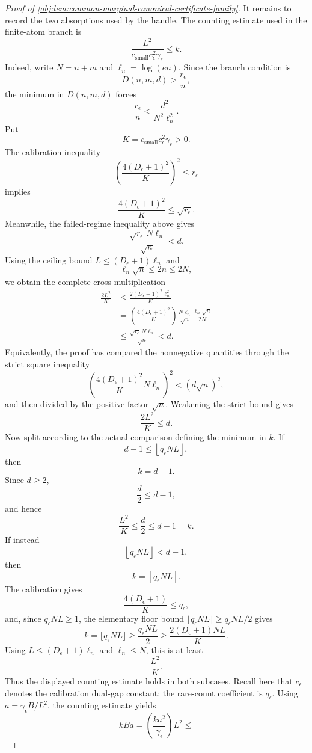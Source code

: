 \documentclass[11pt]{article}
\begin{document}
\begin{proof}[Proof of \cref{obj:lem:common-marginal-canonical-certificate-family}]
It remains to record the two absorptions used by the handle.  The counting estimate used in the finite-atom branch is
\[
\frac{L^2}{c_{\mathrm{small}}c_\epsilon^2\gamma_\epsilon}\le k .
\]
Indeed, write \(N=n+m\) and \(\ell_n=\log(en)\).  Since the branch condition is
\[
D(n,m,d)>\frac{r_\epsilon}{n},
\]
the minimum in \(D(n,m,d)\) forces
\[
\frac{r_\epsilon}{n}
<
\frac{d^2}{N^2\ell_n^2}.
\]
Put
\[
K=c_{\mathrm{small}}c_\epsilon^2\gamma_\epsilon>0.
\]
The calibration inequality
\[
\left(
\frac{4(D_\epsilon+1)^2}{K}
\right)^2
\le r_\epsilon
\]
implies
\[
\frac{4(D_\epsilon+1)^2}{K}\le\sqrt{r_\epsilon}.
\]
Meanwhile, the failed-regime inequality above gives
\[
\frac{\sqrt{r_\epsilon}\,N\ell_n}{\sqrt n}<d.
\]
Using the ceiling bound \(L\le(D_\epsilon+1)\ell_n\) and
\[
\ell_n\sqrt n\le 2n\le 2N,
\]
we obtain the complete cross-multiplication
\[
\begin{aligned}
\frac{2L^2}{K}
&\le
\frac{2(D_\epsilon+1)^2\ell_n^2}{K} \\
&=
\left(\frac{4(D_\epsilon+1)^2}{K}\right)
\frac{N\ell_n}{\sqrt n}
\frac{\ell_n\sqrt n}{2N} \\
&\le
\frac{\sqrt{r_\epsilon}\,N\ell_n}{\sqrt n}
<d.
\end{aligned}
\]
Equivalently, the proof has compared the nonnegative quantities through the strict square inequality
\[
\left(\frac{4(D_\epsilon+1)^2}{K}N\ell_n\right)^2
<
(d\sqrt n)^2,
\]
and then divided by the positive factor \(\sqrt n\).  Weakening the strict bound gives
\[
\frac{2L^2}{K}
\le d.
\]
Now split according to the actual comparison defining the minimum in \(k\).  If
\[
d-1\le \left\lfloor q_\epsilon NL\right\rfloor,
\]
then
\[
k=d-1.
\]
Since \(d\ge2\),
\[
\frac d2\le d-1,
\]
and hence
\[
\frac{L^2}{K}
\le \frac d2\le d-1=k .
\]
If instead
\[
\left\lfloor q_\epsilon NL\right\rfloor<d-1,
\]
then
\[
k=\left\lfloor q_\epsilon NL\right\rfloor .
\]
The calibration gives
\[
\frac{4(D_\epsilon+1)}{K}
\le q_\epsilon,
\]
and, since \(q_\epsilon NL\ge1\), the elementary floor bound \(\lfloor q_\epsilon NL\rfloor\ge q_\epsilon NL/2\) gives
\[
k=\bigl\lfloor q_\epsilon NL\bigr\rfloor
\ge \frac{q_\epsilon NL}{2}
\ge
\frac{2(D_\epsilon+1)NL}{K}.
\]
Using \(L\le(D_\epsilon+1)\ell_n\) and \(\ell_n\le N\), this is at least
\[
\frac{L^2}{K}.
\]
Thus the displayed counting estimate holds in both subcases.  Recall here that \(c_\epsilon\) denotes the calibration dual-gap constant; the rare-count coefficient is \(q_\epsilon\).  Using \(a=\gamma_\epsilon B/L^2\), the counting estimate yields
\[
kBa
=
\left(\frac{k a^2}{\gamma_\epsilon}\right)L^2
\le
\]
\end{proof}
\end{document}
